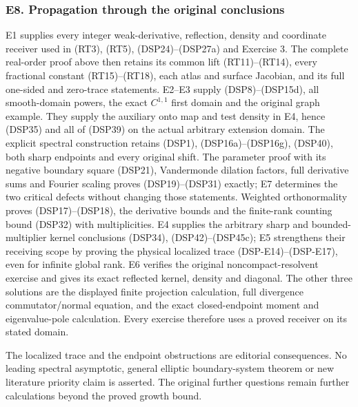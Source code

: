 \documentclass[
  11pt,
]{article}
\makeatletter
\let\ReaderOriginalAnchorStart\hyper@anchorstart
\let\ReaderOriginalAnchorEnd\hyper@anchorend
\let\ReaderPendingAliases\@empty
\def\ReaderArmAliases#1{\gdef\ReaderPendingAliases{#1}}
\def\hyper@anchorstart#1{\ReaderIfNativeAnchorTF{#1}{\ReaderPendingAliases\global\let\ReaderPendingAliases\@empty}{}\ReaderOriginalAnchorStart{#1}}
\makeatother
\begin{document}
\ReaderArmAliases{\ReaderOriginalAnchorStart{e8.-propagation-through-the-original-conclusions}\ReaderOriginalAnchorEnd}
\subsubsection{E8. Propagation through the original
conclusions}\label{e8.-propagation-through-the-original-conclusions}

E1 supplies every integer weak-derivative, reflection, density and
coordinate receiver used in (RT3), (RT5), (DSP24)--(DSP27a) and Exercise
3. The complete real-order proof above then retains its common lift
(RT11)--(RT14), every fractional constant (RT15)--(RT18), each atlas and
surface Jacobian, and its full one-sided and zero-trace statements.
E2--E3 supply (DSP8)--(DSP15d), all smooth-domain powers, the exact
\(C^{1,1}\) first domain and the original graph example. They supply the
auxiliary onto map and test density in E4, hence (DSP35) and all of
(DSP39) on the actual arbitrary extension domain. The explicit spectral
construction retains (DSP1), (DSP16a)--(DSP16g), (DSP40), both sharp
endpoints and every original shift. The parameter proof with its
negative boundary square (DSP21), Vandermonde dilation factors, full
derivative sums and Fourier scaling proves (DSP19)--(DSP31) exactly; E7
determines the two critical defects without changing those statements.
Weighted orthonormality proves (DSP17)--(DSP18), the derivative bounds
and the finite-rank counting bound (DSP32) with multiplicities. E4
supplies the arbitrary sharp and bounded-multiplier kernel conclusions
(DSP34), (DSP42)--(DSP45c); E5 strengthens their receiving scope by
proving the physical localized trace (DSP-E14)--(DSP-E17), even for
infinite global rank. E6 verifies the original noncompact-resolvent
exercise and gives its exact reflected kernel, density and diagonal. The
other three solutions are the displayed finite projection calculation,
full divergence commutator/normal equation, and the exact
closed-endpoint moment and eigenvalue-pole calculation. Every exercise
therefore uses a proved receiver on its stated domain.

The localized trace and the endpoint obstructions are editorial
consequences. No leading spectral asymptotic, general elliptic
boundary-system theorem or new literature priority claim is asserted.
The original further questions remain further calculations beyond the
proved growth bound.

\ReaderArmAliases{\ReaderOriginalAnchorStart{AN03-DSP-LOCALIZATION-EXTENSION}\ReaderOriginalAnchorEnd}
\end{document}
